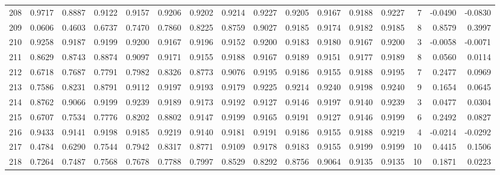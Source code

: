 \begin{tabular}{lrrrrrrrrrrrrrrr}
208 &      0.9717 &  0.8887 &  0.9122 &  0.9157 &  0.9206 &  0.9202 &  0.9214 &  0.9227 &  0.9205 &  0.9167 &   0.9188 &     0.9227 &      7 &                   -0.0490 &                    -0.0830 \\
209 &      0.0606 &  0.4603 &  0.6737 &  0.7470 &  0.7860 &  0.8225 &  0.8759 &  0.9027 &  0.9185 &  0.9174 &   0.9182 &     0.9185 &      8 &                    0.8579 &                     0.3997 \\
210 &      0.9258 &  0.9187 &  0.9199 &  0.9200 &  0.9167 &  0.9196 &  0.9152 &  0.9200 &  0.9183 &  0.9180 &   0.9167 &     0.9200 &      3 &                   -0.0058 &                    -0.0071 \\
211 &      0.8629 &  0.8743 &  0.8874 &  0.9097 &  0.9171 &  0.9155 &  0.9188 &  0.9167 &  0.9189 &  0.9151 &   0.9177 &     0.9189 &      8 &                    0.0560 &                     0.0114 \\
212 &      0.6718 &  0.7687 &  0.7791 &  0.7982 &  0.8326 &  0.8773 &  0.9076 &  0.9195 &  0.9186 &  0.9155 &   0.9188 &     0.9195 &      7 &                    0.2477 &                     0.0969 \\
213 &      0.7586 &  0.8231 &  0.8791 &  0.9112 &  0.9197 &  0.9193 &  0.9179 &  0.9225 &  0.9214 &  0.9240 &   0.9198 &     0.9240 &      9 &                    0.1654 &                     0.0645 \\
214 &      0.8762 &  0.9066 &  0.9199 &  0.9239 &  0.9189 &  0.9173 &  0.9192 &  0.9127 &  0.9146 &  0.9197 &   0.9140 &     0.9239 &      3 &                    0.0477 &                     0.0304 \\
215 &      0.6707 &  0.7534 &  0.7776 &  0.8202 &  0.8802 &  0.9147 &  0.9199 &  0.9165 &  0.9191 &  0.9127 &   0.9146 &     0.9199 &      6 &                    0.2492 &                     0.0827 \\
216 &      0.9433 &  0.9141 &  0.9198 &  0.9185 &  0.9219 &  0.9140 &  0.9181 &  0.9191 &  0.9186 &  0.9155 &   0.9188 &     0.9219 &      4 &                   -0.0214 &                    -0.0292 \\
217 &      0.4784 &  0.6290 &  0.7544 &  0.7942 &  0.8317 &  0.8771 &  0.9109 &  0.9178 &  0.9183 &  0.9155 &   0.9199 &     0.9199 &     10 &                    0.4415 &                     0.1506 \\
218 &      0.7264 &  0.7487 &  0.7568 &  0.7678 &  0.7788 &  0.7997 &  0.8529 &  0.8292 &  0.8756 &  0.9064 &   0.9135 &     0.9135 &     10 &                    0.1871 &                     0.0223 \\

\end{tabular}
